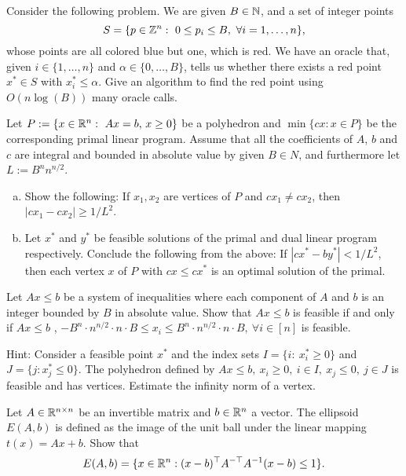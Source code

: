 \documentclass[11pt]{article}
\institute{\'Ecole Polytechnique F\'ed\'erale de Lausanne}
\begin{document}
\makeheader

\problemstar
Consider the following problem. We are given $B\in \mathbb{N}$, and a set of integer points 
$$S=\{p\in \mathbb{Z}^n: \ 0\leq p_i\leq B, \ \forall i=1,\dots,n\},$$ 
whose points are all colored blue but one, which is red. We have an oracle that, given $i \in \{1,\dots,n\}$ and $\alpha \in \{0,\dots,B\}$, tells us whether there exists a red point $x^* \in S$ with $x^*_i \leq \alpha$. 
Give an algorithm to find the red point using $O(n\log(B))$ many oracle calls.



\problem
Let $P := \{x \in \mathbb{R}^n: \ Ax = b, \, x \geq 0 \}$ be a polyhedron and $\min\{cx: x \in P \}$ be the corresponding primal linear program. Assume that all the coefficients of $A$, $b$ and $c$ are integral and bounded in absolute value by given $B \in N$, and furthermore let $L := B^n n^{n/2}$.
\begin{enumerate}[(a)]
	\item Show the following: If $x_1, x_2$ are vertices of $P$ and $cx_1 \neq cx_2$, then $|cx_1 - cx_2| \geq  1/L^2$.
	\item Let $x^*$ and $y^*$ be feasible solutions of the primal and dual linear program respectively. Conclude the following from the above: If $| cx^* - by^*| < 1/L^2$, then each vertex $x$ of $P$ with $cx \leq cx^*$ is an optimal solution of the primal. 
\end{enumerate}

\problem
Let $Ax \leq b$ be a system of inequalities where each component of $A$ and $b$ is an integer bounded by $B$ in absolute value. Show that $Ax \leq b$ is feasible if and only if $Ax \leq b$ , $-B^{n} \cdot n^{n/2} \cdot n \cdot B \leq x_i \leq B^{n} \cdot n^{n/2} \cdot n \cdot B, \ \forall i \in [n]$ is feasible.

 \smallskip
 
Hint: Consider a feasible point $x^*$ and the index sets $I = \{i : \ x^*_i \geq 0\}$ and $J = \{j : x^*_j \leq 0\}$. The polyhedron defined by $Ax \leq b, \ x_i \geq 0, \ i \in I, \ x_j \leq 0, \ j \in J$ is feasible and has vertices. Estimate the infinity norm of a vertex. 

\problem
Let $A \in \mathbb{R}^{n \times n}$ be an invertible matrix and $b \in \mathbb{R}^{n}$ a vector. The ellipsoid $E(A,b)$ is defined as the image of the unit ball under the linear mapping $t(x) = Ax+b$. Show that
$$E(A,b) = \{ x \in \mathbb{R}^n: (x-b)^\top A^{-\top} A^{-1} (x-b) \leq 1 \}.$$
	
\end{document}
